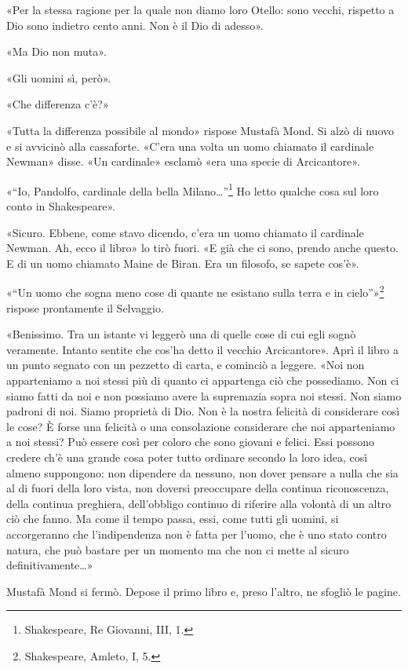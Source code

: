 \documentclass[
a5paper, %
10pt, %
twoside, 
onecolumn, %
openany, %
]{memoir}
\begin{document}
«Per la stessa ragione per la quale non diamo loro Otello: sono vecchi, rispetto a Dio sono indietro cento anni. Non è il Dio di adesso».

«Ma Dio non muta».

«Gli uomini sì, però».

«Che differenza c’è?»

«Tutta la differenza possibile al mondo» rispose Mustafà Mond. Si alzò di nuovo e si avvicinò alla cassaforte. «C’era una volta un uomo chiamato il cardinale Newman» disse. «Un cardinale» esclamò «era una specie di Arcicantore».

«“Io, Pandolfo, cardinale della bella Milano…”\footnote{Shakespeare, Re Giovanni, III, 1.} Ho letto qualche cosa sul loro conto in Shakespeare».

«Sicuro. Ebbene, come stavo dicendo, c’era un uomo chiamato il cardinale Newman. Ah, ecco il libro» lo tirò fuori. «E già che ci sono, prendo anche questo. E di un uomo chiamato Maine de Biran. Era un filosofo, se sapete cos’è».

«“Un uomo che sogna meno cose di quante ne esistano sulla terra e in cielo”»\footnote{Shakespeare, Amleto, I, 5.} rispose prontamente il Selvaggio.

«Benissimo. Tra un istante vi leggerò una di quelle cose di cui egli sognò veramente. Intanto sentite che cos’ha detto il vecchio Arcicantore». Aprì il libro a un punto segnato con un pezzetto di carta, e cominciò a leggere. «Noi non apparteniamo a noi stessi più di quanto ci appartenga ciò che possediamo. Non ci siamo fatti da noi e non possiamo avere la supremazia sopra noi stessi. Non siamo padroni di noi. Siamo proprietà di Dio. Non è la nostra felicità di considerare così le cose? È forse una felicità o una consolazione considerare che noi apparteniamo a noi stessi? Può essere così per coloro che sono giovani e felici. Essi possono credere ch’è una grande cosa poter tutto ordinare secondo la loro idea, così almeno suppongono: non dipendere da nessuno, non dover pensare a nulla che sia al di fuori della loro vista, non doversi preoccupare della continua riconoscenza, della continua preghiera, dell’obbligo continuo di riferire alla volontà di un altro ciò che fanno. Ma come il tempo passa, essi, come tutti gli uomini, si accorgeranno che l’indipendenza non è fatta per l’uomo, che è uno stato contro natura, che può bastare per un momento ma che non ci mette al sicuro definitivamente…»

Mustafà Mond si fermò. Depose il primo libro e, preso l’altro, ne sfogliò le pagine.
\end{document}
